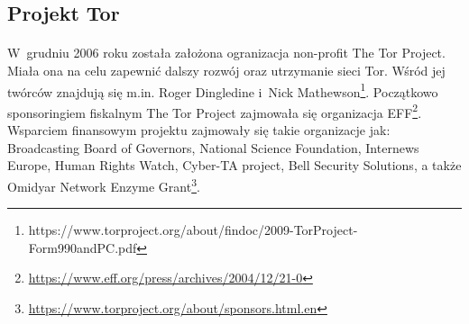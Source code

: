 \subsection{Projekt Tor}\paragraph{}
\indent W~grudniu 2006 roku została założona ogranizacja non-profit The Tor Project. Miała ona na celu zapewnić dalszy rozwój oraz utrzymanie sieci Tor. Wśród jej twórców znajdują się m.in. Roger Dingledine i~Nick Mathewson\footnote{https://www.torproject.org/about/findoc/2009-TorProject-Form990andPC.pdf}. Początkowo sponsoringiem fiskalnym The Tor Project zajmowała się organizacja EFF\footnote{\url{https://www.eff.org/press/archives/2004/12/21-0}}. Wsparciem finansowym projektu zajmowały się takie organizacje jak: Broadcasting Board of Governors, National Science Foundation, Internews Europe, Human Rights Watch, Cyber-TA project, Bell Security Solutions, a także Omidyar Network Enzyme Grant\footnote{\url{https://www.torproject.org/about/sponsors.html.en}}.

